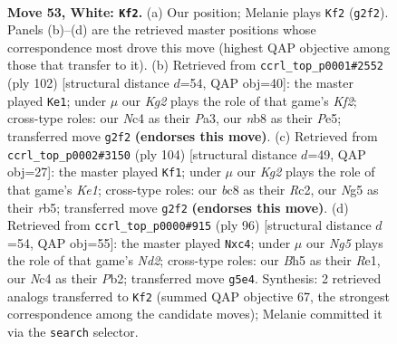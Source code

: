 \documentclass[11pt]{article}
\begin{document}
\clearpage

\begin{figure}[p]\centering
\begin{subfigure}{0.46\textwidth}\centering
\resizebox{\linewidth}{!}{%
\newchessgame
\chessboard[
  setfen={1nb2k2/r7/4p3/1P1n1pNB/1pN2P2/1P4P1/6KP/1R6 w - - 5 53},
  showmover=false,
  pgfstyle=straightmove, color=movearrow, markmove={g2-f2}
]}
\caption{}
\end{subfigure}\hfill
\begin{subfigure}{0.46\textwidth}\centering
\resizebox{\linewidth}{!}{%
\newchessgame
\chessboard[
  setfen={8/p4k2/1p2p3/3pP3/3P1p2/Pn3P2/1P2NKP1/8 w - - 2 52},
  showmover=false,
  pgfstyle=straightmove, color=movearrow, markmove={f2-e1}
]}
\caption{}
\end{subfigure}
\\[4pt]
\begin{subfigure}{0.46\textwidth}\centering
\resizebox{\linewidth}{!}{%
\newchessgame
\chessboard[
  setfen={8/3k4/2n2p2/1r1p1Np1/p2P2P1/P7/1PR2P2/4K3 w - - 20 53},
  showmover=false,
  pgfstyle=straightmove, color=movearrow, markmove={e1-f1}
]}
\caption{}
\end{subfigure}\hfill
\begin{subfigure}{0.46\textwidth}\centering
\resizebox{\linewidth}{!}{%
\newchessgame
\chessboard[
  setfen={1r6/2n5/p2p1n2/p2P1k2/2p5/2N3P1/1PPN1P2/2K1R3 w - - 6 49},
  showmover=false,
  pgfstyle=straightmove, color=movearrow, markmove={d2-c4}
]}
\caption{}
\end{subfigure}
\caption{\textbf{Move 53, White: \texttt{Kf2}.} (a) Our position; Melanie plays \texttt{Kf2} (\texttt{g2f2}). Panels (b)--(d) are the retrieved master positions whose correspondence most drove this move (highest QAP objective among those that transfer to it). (b) Retrieved from \texttt{ccrl\_top\_p0001\#2552} (ply 102) [structural distance $d$=54, QAP obj=40]: the master played \texttt{Ke1}; under $\mu$ our \emph{Kg2} plays the role of that game's \emph{Kf2}; cross-type roles: our \emph{N}c4 as their \emph{P}a3, our \emph{n}b8 as their \emph{P}e5; transferred move \texttt{g2f2} \textbf{(endorses this move)}. (c) Retrieved from \texttt{ccrl\_top\_p0002\#3150} (ply 104) [structural distance $d$=49, QAP obj=27]: the master played \texttt{Kf1}; under $\mu$ our \emph{Kg2} plays the role of that game's \emph{Ke1}; cross-type roles: our \emph{b}c8 as their \emph{R}c2, our \emph{N}g5 as their \emph{r}b5; transferred move \texttt{g2f2} \textbf{(endorses this move)}. (d) Retrieved from \texttt{ccrl\_top\_p0000\#915} (ply 96) [structural distance $d$=54, QAP obj=55]: the master played \texttt{Nxc4}; under $\mu$ our \emph{Ng5} plays the role of that game's \emph{Nd2}; cross-type roles: our \emph{B}h5 as their \emph{R}e1, our \emph{N}c4 as their \emph{P}b2; transferred move \texttt{g5e4}. Synthesis: 2 retrieved analogs transferred to \texttt{Kf2} (summed QAP objective 67, the strongest correspondence among the candidate moves); Melanie committed it via the \texttt{search} selector.}
\label{fig:thought-m104}
\end{figure}
\end{document}
